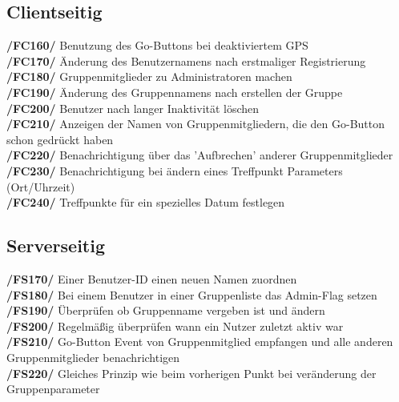 \subsection{Clientseitig}
     \textbf{/FC160/} Benutzung des Go-Buttons bei deaktiviertem GPS\\
     \textbf{/FC170/} Änderung des Benutzernamens nach erstmaliger Registrierung\\
     \textbf{/FC180/} Gruppenmitglieder zu Administratoren machen                \\
     \textbf{/FC190/} Änderung des Gruppennamens nach erstellen der Gruppe        \\
     \textbf{/FC200/} Benutzer nach langer Inaktivität löschen                     \\
     \textbf{/FC210/} Anzeigen der Namen von Gruppenmitgliedern, die den Go-Button schon gedrückt haben\\
     \textbf{/FC220/} Benachrichtigung über das 'Aufbrechen' anderer Gruppenmitglieder\\
     \textbf{/FC230/} Benachrichtigung bei ändern eines Treffpunkt Parameters (Ort/Uhrzeit)\\
     \textbf{/FC240/} Treffpunkte für ein spezielles Datum festlegen\\
\subsection{Serverseitig}
     \textbf{/FS170/} Einer Benutzer-ID einen neuen Namen zuordnen\\
     \textbf{/FS180/} Bei einem Benutzer in einer Gruppenliste das Admin-Flag setzen\\
     \textbf{/FS190/} Überprüfen ob Gruppenname vergeben ist und ändern\\
     \textbf{/FS200/} Regelmäßig überprüfen wann ein Nutzer zuletzt aktiv war\\
     \textbf{/FS210/} Go-Button Event von Gruppenmitglied empfangen und alle anderen Gruppenmitglieder benachrichtigen\\
     \textbf{/FS220/} Gleiches Prinzip wie beim vorherigen Punkt bei veränderung der Gruppenparameter\\
